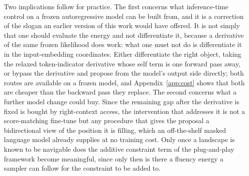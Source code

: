Two implications follow for practice. The first concerns what inference-time control on a frozen autoregressive model can be built from, and it is a correction of the slogan an earlier version of this work would have offered. It is not simply that one should evaluate the energy and not differentiate it, because a derivative of the same frozen likelihood does work: what one must not do is differentiate it in the input-embedding coordinates. Either differentiate the right object, taking the relaxed token-indicator derivative whose self term is one forward pass away, or bypass the derivative and propose from the model's output side directly; both routes are available on a frozen model, and Appendix~\ref{app:cost} shows that both are cheaper than the backward pass they replace. The second concerns what a further model change could buy. Since the remaining gap after the derivative is fixed is bought by right-context access, the intervention that addresses it is not a score-matching fine-tune but any procedure that gives the proposal a bidirectional view of the position it is filling, which an off-the-shelf masked language model already supplies at no training cost. Only once a landscape is known to be navigable does the additive constraint term of the plug-and-play framework become meaningful, since only then is there a fluency energy a sampler can follow for the constraint to be added to.
